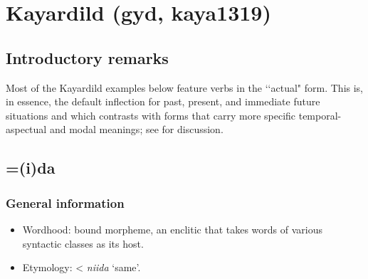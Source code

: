 \section{Kayardild (gyd, kaya1319)}
\label{appendixKayardild}

\subsection{Introductory remarks}
Most of the Kayardild examples below feature verbs in the \lq\lq actual" form. This is, in essence, the default inflection for past, present, and immediate future situations and which contrasts with forms that carry more specific temporal-aspectual and modal meanings; see \textcite[256–257]{Evans1995} for discussion.

\subsection{=(i)da}
\subsubsection{General information}

\begin{itemize}
	\item Wordhood: bound morpheme, an enclitic that takes words of various syntactic classes as its host.
	\item Etymology: < \textit{niida} \lq same'.
\end{itemize}

